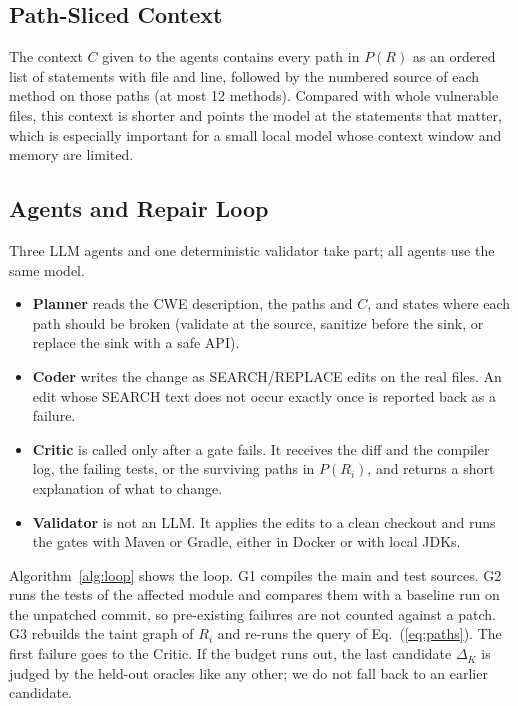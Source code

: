 \documentclass[conference]{IEEEtran}
\begin{document}
\subsection{Path-Sliced Context}
The context $C$ given to the agents contains every path in $P(R)$ as an ordered list of
statements with file and line, followed by the numbered source of each method on those
paths (at most 12 methods). Compared with whole vulnerable files, this context is
shorter and points the model at the statements that matter, which is especially
important for a small local model whose context window and memory are limited.

\subsection{Agents and Repair Loop}
\label{sec:loop}
Three LLM agents and one deterministic validator take part; all agents use the same
model.
\begin{itemize}
\item \textbf{Planner} reads the CWE description, the paths and $C$, and states where
each path should be broken (validate at the source, sanitize before the sink, or replace
the sink with a safe API).
\item \textbf{Coder} writes the change as SEARCH/REPLACE edits on the real files. An
edit whose SEARCH text does not occur exactly once is reported back as a failure.
\item \textbf{Critic} is called only after a gate fails. It receives the diff and the
compiler log, the failing tests, or the surviving paths in $P(R_i)$, and returns a short
explanation of what to change.
\item \textbf{Validator} is not an LLM. It applies the edits to a clean checkout and runs
the gates with Maven or Gradle, either in Docker or with local JDKs.
\end{itemize}
Algorithm~\ref{alg:loop} shows the loop. G1 compiles the main and test sources. G2 runs
the tests of the affected module and compares them with a baseline run on the unpatched
commit, so pre-existing failures are not counted against a patch. G3 rebuilds the taint
graph of $R_i$ and re-runs the query of Eq.~(\ref{eq:paths}). The first failure goes to
the Critic. If the budget runs out, the last candidate $\Delta_K$ is judged by the
held-out oracles like any other; we do not fall back to an earlier candidate.
\end{document}
